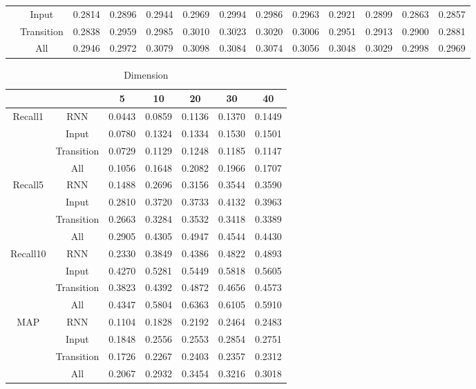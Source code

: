 \documentclass[conference]{IEEEtran}
\begin{document}
\begin{table}[htbp]
\begin{tabular}{ccccccccccccc}
        & Input&   0.2814  &0.2896&  0.2944 & 0.2969 & 0.2994&  0.2986  &0.2963 & 0.2921&  0.2899 & 0.2863 & 0.2857   \\
        & Transition & 0.2838  &0.2959  &0.2985  &0.3010  &0.3023  &0.3020  &0.3006 & 0.2951&  0.2913  &0.2900  &0.2881   \\
        &  All &0.2946  &0.2972  &0.3079 & 0.3098  &0.3084  &0.3074  &0.3056 & 0.3048&  0.3029&  0.2998 & 0.2969   \\
    \bottomrule
\end{tabular}%
\label{tab:Dimension1}%
\end{table}%

\begin{table}[htbp]
\centering\scriptsize
\caption{Dimension}
\begin{tabular}{ccccccc}
    \toprule
        &      &5   &10   &20  & 30  & 40 \\
    \midrule
    \multirow{4}[0]{*}{Recall1}
        & RNN& 0.0443  & 0.0859 & 0.1136 & 0.1370&  0.1449 \\
        &Input   &0.0780   &  0.1324  & 0.1334&   0.1530&   0.1501 \\
        &Transition &   0.0729 & 0.1129&  0.1248 & 0.1185  &0.1147  \\
        &All &0.1056  &  0.1648  &0.2082  &0.1966&  0.1707 \\
    \midrule
    \multirow{4}[0]{*}{Recall5}
        &RNN&    0.1488 &   0.2696 & 0.3156&  0.3544&  0.3590\\
        & Input  &   0.2810&  0.3720  &0.3733 & 0.4132  &0.3963 \\
        & Transition &  0.2663 &  0.3284 & 0.3532 & 0.3418&  0.3389 \\
        &All &0.2905  &  0.4305&  0.4947  &0.4544&  0.4430 \\
    \midrule
    \multirow{4}[0]{*}{Recall10}
        &RNN & 0.2330    &0.3849  &0.4386&  0.4822&  0.4893 \\
        &Input   &0.4270  &  0.5281&  0.5449 & 0.5818  &0.5605 \\
        &Transition  & 0.3823 &   0.4392  & 0.4872  & 0.4656  & 0.4573 \\
        &All & 0.4347   &0.5804 & 0.6363 & 0.6105  &0.5910 \\
    \midrule
    \multirow{4}[0]{*}{MAP}
        &RNN&  0.1104  &0.1828  &0.2192 & 0.2464 & 0.2483 \\
        & Input&  0.1848   &  0.2556  &0.2553&  0.2854&  0.2751  \\
        & Transition &  0.1726&   0.2267  &0.2403 & 0.2357&  0.2312 \\
        &  All & 0.2067   &0.2932&  0.3454&  0.3216&  0.3018 \\
    \bottomrule
\end{tabular}%
\label{tab:Dimension2}%
\end{table}%
\end{document}
